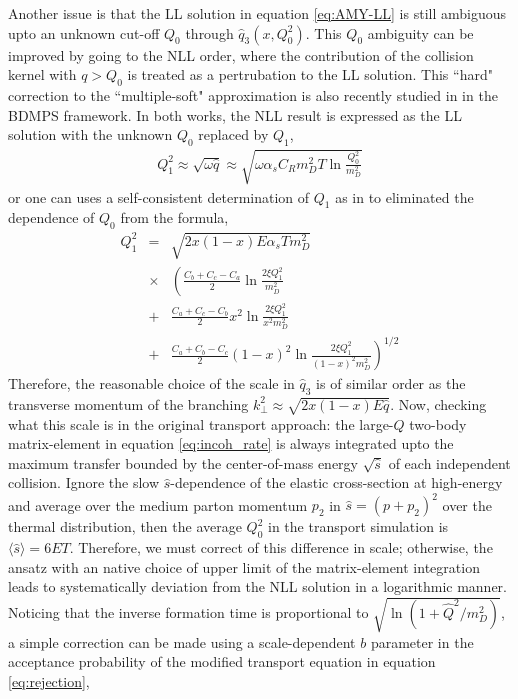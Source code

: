 \documentclass[aps, prc, reprint, amsmath, groupedaddress, nofootinbib]{revtex4-1}
\begin{document}
Another issue is that the LL solution in equation \ref{eq:AMY-LL} is still ambiguous upto an unknown cut-off $Q_0$ through $\hat{q}_3(x, Q_0^2)$.
This $Q_0$ ambiguity can be improved by going to the NLL order, where the contribution of the collision kernel with $q>Q_0$ is treated as a pertrubation to the LL solution.
This ``hard" correction to the ``multiple-soft" approximation is also recently studied in \cite{Mehtar-Tani:2019tvy} in the BDMPS framework.
In both works, the NLL result is expressed as the LL solution with the unknown $Q_0$ replaced by $Q_1$,
\begin{eqnarray}
Q_1^2  \approx \sqrt{\omega \hat{q}} \approx \sqrt{\omega \alpha_s C_R m_D^2 T \ln\frac{Q_0^2}{m_D^2}}
\label{eq:Q1}
\end{eqnarray}
or one can uses a self-consistent determination of $Q_1$ as in \cite{Arnold:2008zu} to eliminated the dependence of $Q_0$ from the formula,
\begin{eqnarray}
Q_1^2 &=& \sqrt{2 x (1-x) E \alpha_s T m_D^2}\\\nonumber
&\times & \left(
\frac{C_b+C_c-C_a}{2}\ln\frac{2\xi Q_1^2}{m_D^2} \right.\\\nonumber 
&+& \frac{C_a+C_c-C_b}{2} x^2 \ln\frac{2\xi Q_1^2}{x^2 m_D^2} \\\nonumber 
&+& \left.\frac{C_a+C_b-C_c}{2} (1-x)^2 \ln\frac{2\xi Q_1^2}{(1-x)^2 m_D^2} \right)^{1/2}
\label{eq:Q1-sf}
\end{eqnarray}
Therefore, the reasonable choice of the scale in $\hat{q}_3$ is of similar order as the transverse momentum of the branching $k_\perp^2 \approx \sqrt{2x(1-x)E \hat{q}}$.
Now, checking what this scale is in the original transport approach: the large-$Q$ two-body matrix-element in equation \ref{eq:incoh_rate} is always integrated upto the maximum transfer bounded by the center-of-mass energy $\sqrt{\hat{s}}$ of each independent collision. 
Ignore the slow $\hat{s}$-dependence of the elastic cross-section at high-energy and average over the medium parton momentum $p_2$ in $\hat{s} = (p+p_2)^2$ over the thermal distribution, then the average $Q_{0}^2$ in the transport simulation is  $\langle\hat{s}\rangle = 6ET$.
Therefore, we must correct of this difference in scale; otherwise, the ansatz with an native choice of upper limit of the matrix-element integration leads to systematically deviation from the NLL solution in a logarithmic manner.
Noticing that the inverse formation time is proportional to $\sqrt{\ln(1+\hat{Q}^2/m_D^2)}$, a simple correction can be made using a scale-dependent $b$ parameter in the acceptance probability of the modified transport equation in equation \ref{eq:rejection},
\end{document}
